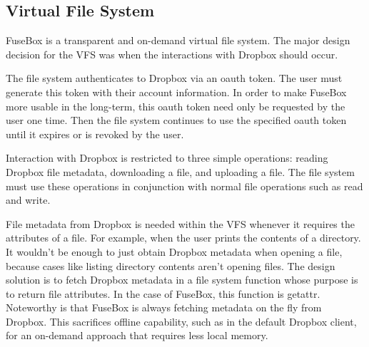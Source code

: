 \documentclass[11pt,twocolumn,letterpaper]{article}
\newcommand{\appname}{FuseBox }
\newcommand{\appnameWOspace}{FuseBox}
\begin{document}
\subsection{Virtual File System}
\label{sec:fs}
\appname is a transparent and on-demand virtual file system. The major design
decision for the VFS was when the interactions with Dropbox should
occur. 
\par The file system authenticates to Dropbox via an oauth token. The user must
generate this token with their account information. In order to make
\appname more usable in the long-term, this oauth token need only be
requested by the user one time. Then the file system continues to
use the specified oauth token until it expires or is
revoked by the user. 
\par Interaction with Dropbox is restricted to three simple
operations: reading Dropbox file metadata, downloading a file, 
and uploading a file. The file system must use these operations in
conjunction with normal file operations such as read and write. 
\par File metadata from Dropbox is needed within the VFS whenever it
requires the attributes of a file. For example, when the user prints
the contents of a directory. It wouldn't be enough to just obtain Dropbox
metadata when opening a file, because cases like listing directory contents
aren't opening files. The design solution is to fetch Dropbox metadata
in a file system function whose purpose is to return file
attributes. In the case of \appnameWOspace, this function is getattr. 
Noteworthy is that \appname is always fetching metadata on the fly
from Dropbox. This sacrifices offline capability, such as in the
default Dropbox client, for an on-demand approach that requires less
local memory. 
\end{document}
